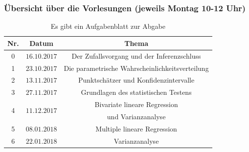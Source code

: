 \documentclass[usenames,dvipsnames,handout]{beamer}
\begin{document}
 \begin{frame}
 \frametitle{Übersicht über die Vorlesungen (jeweils Montag 10-12 Uhr)}%
    \begin{table}
\begin{center}
\caption{\colorbox{yellow!40}{Es gibt ein Aufgabenblatt zur Abgabe}}
  \begin{tabular}{|c|c|c|}
    \hline
    Nr. & Datum & Thema \\ \hline
    0 &   $ 16.10.2017$   &  \colorbox{blue!10}{  Der Zufallsvorgang und der Inferenzschluss}   \\ \hline
    \colorbox{yellow!40}{1} &  $23.10.2017$  &   \colorbox{blue!10}{Die parametrische  Wahrscheinlichkeitsverteilung } \\ \hline
    \colorbox{yellow!40}{2} &   $13.11.2017$   &   \colorbox{green!40}{Punktschätzer und Konfidenzintervalle }\\ \hline
    \colorbox{yellow!40}{3} &   $27.11.2017$   &   \colorbox{green!40}{Grundlagen des statistischen Testens}\\ \hline
  \multirow{2}{*}{\colorbox{yellow!40}{4}} &  \multirow{2}{*}{$11.12.2017$}& \colorbox{violet!40}{Bivariate lineare Regression} \\
                   &        & \colorbox{violet!40}{und Varianzanalyse}\\ \hline  
    \colorbox{yellow!40}{5} & $08.01.2018$      &  \colorbox{violet!40}{Multiple lineare Regression}  \\ \hline   
    6 &   $22.01.2018$     &  \colorbox{violet!40}{Varianzanalyse} \\ \hline
  \end{tabular}
  \end{center}
  \label{tab:multicol}
  \end{table}
\end{frame}
\end{document}
